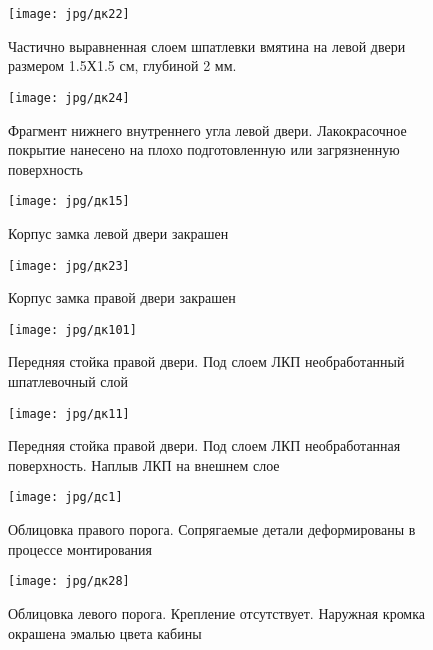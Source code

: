 {%
   \begin{figure}[H]\centering
   	\parbox[t]{0.49\textwidth}
   	{\centering
   		\texttt{[image: jpg/дк22]}
   		\caption{\footnotesize {Частично выравненная слоем шпатлевки вмятина на левой двери размером 1.5Х1.5 см, глубиной 2 мм.}}
   		\label{дверьшпатлевка}}
   	\hfil \hfil
   	\parbox[t]{0.49\textwidth}
   	{\centering
   		\texttt{[image: jpg/дк24]}
   		\caption{\footnotesize {Фрагмент нижнего  внутреннего угла  левой двери. Лакокрасочное покрытие нанесено на плохо подготовленную или загрязненную поверхность}}
   		\label{дверьлеваявнутри}}
   \end{figure}
%   
%   
%   
   \begin{figure}[H]\centering
   	\parbox[t]{0.49\textwidth}
   	{\centering
   		\texttt{[image: jpg/дк15]}
   		\caption{\footnotesize {Корпус замка левой двери закрашен}}
   		\label{замоклевый}}
   	\hfil \hfil
   	\parbox[t]{0.49\textwidth}
   	{\centering
   		\texttt{[image: jpg/дк23]}
   		\caption{\footnotesize {Корпус замка правой двери закрашен}}
   		\label{замокправый}}
   \end{figure}
%   
   
    \begin{figure}[H]\centering
   	\parbox[t]{0.49\textwidth}
   	{\centering
   		\texttt{[image: jpg/дк101]}
   		\caption{\footnotesize {Передняя стойка правой двери. Под слоем ЛКП необработанный шпатлевочный слой}}
   		\label{шпатлевкасправа}}
   	\hfil \hfil
   	\parbox[t]{0.49\textwidth}
   	{\centering
   		\texttt{[image: jpg/дк11]}
   		\caption{\footnotesize {Передняя стойка правой двери. Под слоем ЛКП необработанная поверхность. Наплыв ЛКП на внешнем слое}}
   		\label{стойканаплыв}}
   \end{figure}





 \begin{figure}[H]\centering
	\parbox[t]{0.49\textwidth}
	{\centering
		\texttt{[image: jpg/дс1]}
		\caption{\footnotesize {Облицовка правого порога.  Сопрягаемые детали деформированы в процессе монтирования}}
		\label{облицовкасправа}}
	\hfil \hfil
	\parbox[t]{0.49\textwidth}
	{\centering
		\texttt{[image: jpg/дк28]}
		\caption{\footnotesize {Облицовка левого порога. Крепление отсутствует. Наружная кромка окрашена эмалью цвета кабины}}
		\label{облицовкаслева}}
\end{figure}
%   
   

}
